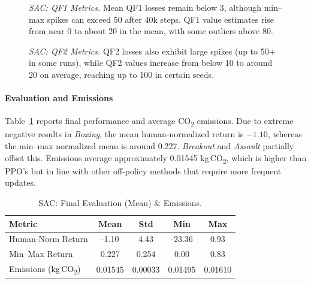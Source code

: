 \begin{figure}
	\centering
	\caption{\emph{SAC: QF1 Metrics.} Mean QF1 losses remain below 3, although min–max spikes can exceed 50 after 40k steps. QF1 value estimates rise from near 0 to about 20 in the mean, with some outliers above 80.}
	\label{fig:sac_q_metrics_1}
\end{figure}

\begin{figure}
	\centering
	\quad
	\caption{\emph{SAC: QF2 Metrics.} QF2 losses also exhibit large spikes (up to 50+ in some runs), while QF2 values increase from below 10 to around 20 on average, reaching up to 100 in certain seeds.}
	\label{fig:sac_q_metrics_2}
\end{figure}

\paragraph{Evaluation and Emissions}
Table~\ref{tab:sac_eval} reports final performance and average CO\textsubscript{2} emissions. Due to extreme negative results in \emph{Boxing}, the mean human‐normalized return is \(-1.10\), whereas the min–max normalized mean is around 0.227. \emph{Breakout} and \emph{Assault} partially offset this. Emissions average approximately 0.01545 kg\,CO\textsubscript{2}, which is higher than PPO's but in line with other off-policy methods that require more frequent updates.

\begin{table}
	\centering
	\caption{SAC: Final Evaluation (Mean) \& Emissions.}
	\label{tab:sac_eval}
	\begin{tabular}{lcccc}
		\toprule
		\textbf{Metric} & \textbf{Mean} & \textbf{Std} & \textbf{Min} & \textbf{Max} \\
		\midrule
		Human‐Norm Return & -1.10 & 4.43 & -23.36 & 0.93 \\
		Min–Max Return   & 0.227 & 0.254 & 0.00   & 0.83 \\
		Emissions (kg\,CO\textsubscript{2}) & 0.01545 & 0.00033 & 0.01495 & 0.01610 \\
		\bottomrule
	\end{tabular}
\end{table}

